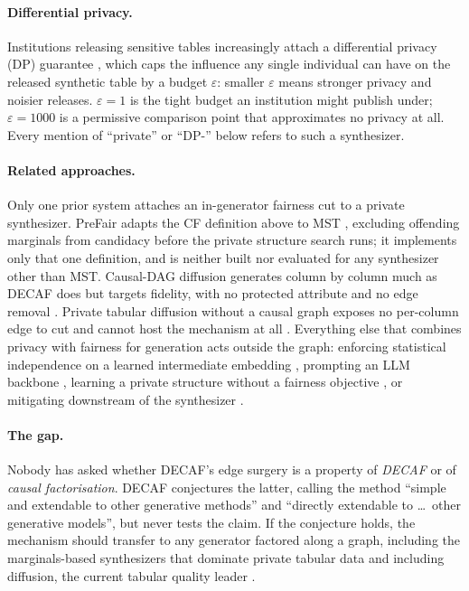 \documentclass{article}
\begin{document}
\paragraph{Differential privacy.}
Institutions releasing sensitive tables increasingly attach a differential
privacy (DP) guarantee \citep{dwork2006calibrating}, which caps the
influence any single individual can have on the released synthetic table by
a budget $\varepsilon$: smaller $\varepsilon$ means stronger privacy and
noisier releases. $\varepsilon{=}1$ is the tight budget an institution might
publish under; $\varepsilon{=}1000$ is a permissive comparison point that
approximates no privacy at all. Every mention of ``private'' or ``DP-''
below refers to such a synthesizer.

\paragraph{Related approaches.}
Only one prior system attaches an in-generator fairness cut to a private
synthesizer. PreFair \citep{pujol2023prefair} adapts the CF definition above
to MST \citep{mckenna2021mst}, excluding offending marginals from candidacy
before the private structure search runs; it implements only that one
definition, and is neither built nor evaluated for any synthesizer other than
MST. Causal-DAG diffusion generates column by column much as DECAF does but
targets fidelity, with no protected attribute and no edge removal
\citep{zhang2025causaldifftab,jacob2026tabscm}. Private tabular diffusion
without a causal graph exposes no per-column edge to cut and cannot host the
mechanism at all \citep{zhu2024dptldm}. Everything else that combines
privacy with fairness for generation acts outside the graph: enforcing
statistical independence on a learned intermediate embedding
\citep{hyrup2025flip,sarmin2025pfwgan}, prompting an LLM backbone
\citep{nagesh2025faircausesyn}, learning a private structure without a
fairness objective \citep{jia2025pradagan}, or mitigating downstream of the
synthesizer \citep{angelozzi2026where}.

\paragraph{The gap.}
Nobody has asked whether DECAF's edge surgery is a property of \emph{DECAF}
or of \emph{causal factorisation}. DECAF conjectures the latter, calling the
method ``simple and extendable to other generative methods'' and ``directly
extendable to \ldots\ other generative models'', but never tests the claim.
If the conjecture holds, the mechanism
should transfer to any generator factored along a graph, including the
marginals-based synthesizers that dominate private tabular data
\citep{mckenna2021mst,zhang2014privbayes,zhang2021privsyn,mckenna2022aim} and
including diffusion, the current tabular quality leader
\citep{kotelnikov2023tabddpm}.
\end{document}
